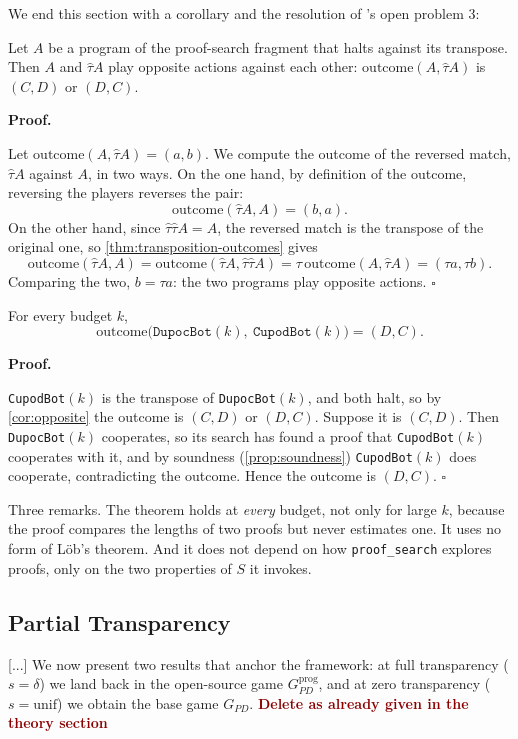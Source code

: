 \documentclass[twoside,11pt]{article}
\renewcommand{\BlackBox}{\ensuremath{\square}}
\renewenvironment{proof}[1][Proof]{%
  \par\noindent\textbf{#1.}\enspace\ignorespaces
}{%
  \ifhmode\unskip\nobreak\hfill\quad\else\noindent\hfill\fi
  \BlackBox\par\addvspace{2mm}%
}
\newcommand{\boldred}[1]{\textbf{\textcolor{darkred}{#1}}}
\begin{document}
We end this section with a corollary and the resolution of \citet{Critch}'s open problem 3:
\begin{corollary}\label{cor:opposite}
Let $A$ be a program of the proof-search fragment that halts against its transpose. Then $A$ and $\hat\tau A$ play opposite actions against each other: $\mathrm{outcome}(A, \hat\tau A)$ is $(C, D)$ or $(D, C)$.
\end{corollary}
\begin{proof}
Let $\mathrm{outcome}(A, \hat\tau A) = (a, b)$. We compute the outcome of the reversed match, $\hat\tau A$ against $A$, in two ways. On the one hand, by definition of the outcome, reversing the players reverses the pair:
\[
  \mathrm{outcome}(\hat\tau A, A) = (b, a).
\]
On the other hand, since $\hat\tau\hat\tau A = A$, the reversed match is the transpose of the original one, so \cref{thm:transposition-outcomes} gives
\[
  \mathrm{outcome}(\hat\tau A, A)
  = \mathrm{outcome}(\hat\tau A, \hat\tau\hat\tau A)
  = \tau\,\mathrm{outcome}(A, \hat\tau A)
  = (\tau a, \tau b).
\]
Comparing the two, $b = \tau a$: the two programs play opposite actions.
\end{proof}


\begin{theorem}\label{thm:dupoc-cupod}
For every budget $k$,
\[
  \mathrm{outcome}\big(\texttt{DupocBot}(k),\ \texttt{CupodBot}(k)\big) = (D, C).
\]
\end{theorem}

\begin{proof}
\texttt{CupodBot}$(k)$ is the transpose of \texttt{DupocBot}$(k)$, and both halt, so by \cref{cor:opposite} the outcome is $(C, D)$ or $(D, C)$. Suppose it is $(C, D)$. Then \texttt{DupocBot}$(k)$ cooperates, so its search has found a proof that \texttt{CupodBot}$(k)$ cooperates with it, and by soundness (\cref{prop:soundness}) \texttt{CupodBot}$(k)$ does cooperate, contradicting the outcome. Hence the outcome is $(D, C)$.
\end{proof}


Three remarks. The theorem holds at \emph{every} budget, not only for large $k$, because the proof compares the lengths of two proofs but never estimates one. It uses no form of Löb's theorem. And it does not depend on how \texttt{proof\_search} explores proofs, only on the two properties of $S$ it invokes.

\subsection{Partial Transparency}
[...]
\newline
\newline
We now present two results that anchor the framework: at full transparency ($s = \delta$) we land back in the open-source game $G_{PD}^\mathrm{prog}$, and at zero transparency ($s = \mathrm{unif}$) we obtain the base game $G_{PD}$. \boldred{Delete as already given in the theory section}
\end{document}
